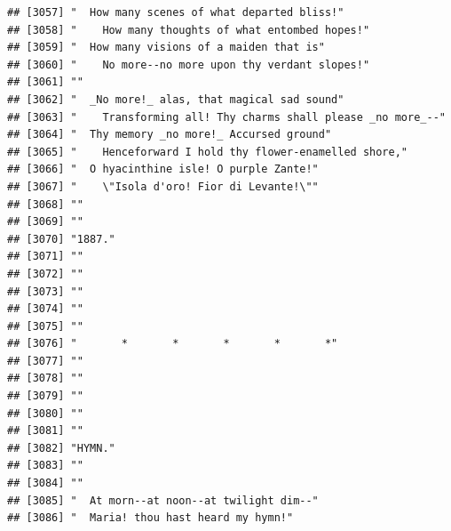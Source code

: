\documentclass{article}\usepackage[]{graphicx}\usepackage[]{color}
\makeatletter
\newenvironment{kframe}{%
 \def\at@end@of@kframe{}%
 \ifinner\ifhmode%
  \def\at@end@of@kframe{\end{minipage}}%
  \begin{minipage}{\columnwidth}%
 \fi\fi%
 \def\FrameCommand##1{\hskip\@totalleftmargin \hskip-\fboxsep
 \colorbox{shadecolor}{##1}\hskip-\fboxsep
     \hskip-\linewidth \hskip-\@totalleftmargin \hskip\columnwidth}%
 \MakeFramed {\advance\hsize-\width
   \@totalleftmargin\z@ \linewidth\hsize
   \@setminipage}}%
 {\par\unskip\endMakeFramed%
 \at@end@of@kframe}
\newenvironment{knitrout}{}{} %
\makeatother
\begin{document}
\begin{knitrout}
\begin{kframe}
\begin{verbatim}
## [3057] "  How many scenes of what departed bliss!"                                   
## [3058] "    How many thoughts of what entombed hopes!"                               
## [3059] "  How many visions of a maiden that is"                                      
## [3060] "    No more--no more upon thy verdant slopes!"                               
## [3061] ""                                                                            
## [3062] "  _No more!_ alas, that magical sad sound"                                   
## [3063] "    Transforming all! Thy charms shall please _no more_--"                   
## [3064] "  Thy memory _no more!_ Accursed ground"                                     
## [3065] "    Henceforward I hold thy flower-enamelled shore,"                         
## [3066] "  O hyacinthine isle! O purple Zante!"                                       
## [3067] "    \"Isola d'oro! Fior di Levante!\""                                       
## [3068] ""                                                                            
## [3069] ""                                                                            
## [3070] "1887."                                                                       
## [3071] ""                                                                            
## [3072] ""                                                                            
## [3073] ""                                                                            
## [3074] ""                                                                            
## [3075] ""                                                                            
## [3076] "       *       *       *       *       *"                                    
## [3077] ""                                                                            
## [3078] ""                                                                            
## [3079] ""                                                                            
## [3080] ""                                                                            
## [3081] ""                                                                            
## [3082] "HYMN."                                                                       
## [3083] ""                                                                            
## [3084] ""                                                                            
## [3085] "  At morn--at noon--at twilight dim--"                                       
## [3086] "  Maria! thou hast heard my hymn!"                                           

\end{verbatim}
\end{kframe}
\end{knitrout}
\end{document}

